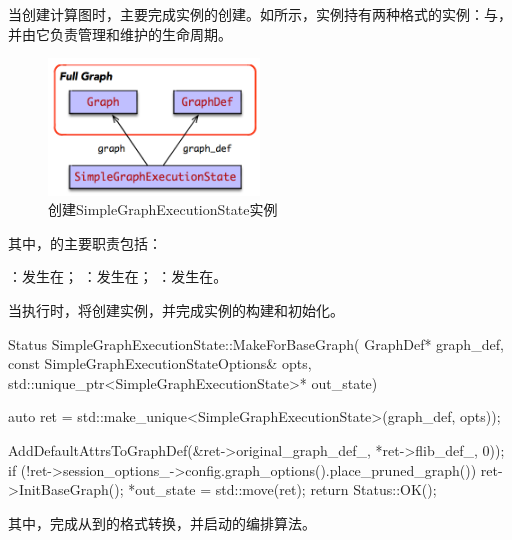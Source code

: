 \begin{content}
当创建计算图时，主要完成实例的创建。如所示，实例持有两种格式的实例：与，并由它负责管理和维护的生命周期。

\begin{figure}[H]
\centering
\includegraphics[width=0.5\textwidth]{figures/local-simple-graph-execution-state-model.png}
\caption{创建SimpleGraphExecutionState实例}
 \label{fig:local-simple-graph-execution-state-model}
\end{figure}

其中，的主要职责包括：

\begin{enum}
  ：发生在；
  ：发生在；
  ：发生在。
\end{enum}

当执行时，将创建实例，并完成实例的构建和初始化。

\begin{leftbar}
\begin{c++}
Status SimpleGraphExecutionState::MakeForBaseGraph(
    GraphDef* graph_def, const SimpleGraphExecutionStateOptions& opts,
    std::unique_ptr<SimpleGraphExecutionState>* out_state) {
  auto ret = std::make_unique<SimpleGraphExecutionState>(graph_def, opts));

  AddDefaultAttrsToGraphDef(&ret->original_graph_def_, *ret->flib_def_, 0));
  if (!ret->session_options_->config.graph_options().place_pruned_graph()) {
    ret->InitBaseGraph();
  }
  *out_state = std::move(ret);
  return Status::OK();
}
\end{c++}
\end{leftbar}

其中，完成从到的格式转换，并启动的编排算法。


\end{content}
